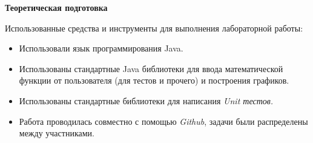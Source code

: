 \textbf{Теоретическая подготовка}
\vspace{0.5cm}

Использованные средства и инструменты для выполнения лабораторной работы:
\begin{itemize}
    \item Использовали язык программирования Java.
    \item Использованы стандартные Java библиотеки для ввода математической функции от пользователя (для тестов и прочего) и построения графиков.
    \item Использованы стандартные библиотеки для написания \textit{Unit тестов.}
    \item Работа проводилась совместно с помощью \textit{Github}, задачи были распределены между участниками.
\end{itemize}
